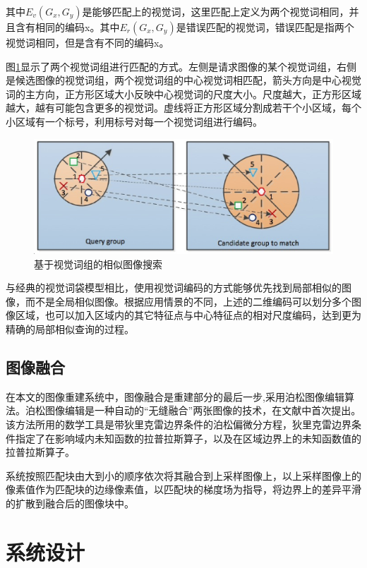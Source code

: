 \documentclass[UTF8]{csoarticle}
\begin{document}
其中\(E_v(G_x,G_y)\)是能够匹配上的视觉词，这里匹配上定义为两个视觉词相同，并且含有相同的编码x。其中\(E_r(G_x,G_y)\)是错误匹配的视觉词，错误匹配是指两个视觉词相同，但是含有不同的编码x。

图\ref{fig:visual}显示了两个视觉词组进行匹配的方式。左侧是请求图像的某个视觉词组，右侧是候选图像的视觉词组，两个视觉词组的中心视觉词相匹配，箭头方向是中心视觉词的主方向，正方形区域大小反映中心视觉词的尺度大小。尺度越大，正方形区域越大，越有可能包含更多的视觉词。虚线将正方形区域分割成若干个小区域，每个小区域有一个标号，利用标号对每一个视觉词组进行编码。

\begin{figure}
\centering\includegraphics[width=12cm]{visual_group}
\caption{基于视觉词组的相似图像搜索}
\label{fig:visual}
\end{figure}

与经典的视觉词袋模型相比，使用视觉词编码的方式能够优先找到局部相似的图像，而不是全局相似图像。根据应用情景的不同，上述的二维编码可以划分多个图像区域，也可以加入区域内的其它特征点与中心特征点的相对尺度编码，达到更为精确的局部相似查询的过程。

\subsection{图像融合}
在本文的图像重建系统中，图像融合是重建部分的最后一步,采用泊松图像编辑算法。泊松图像编辑是一种自动的“无缝融合”两张图像的技术，在文献\cite{Perez:2003ul}中首次提出。该方法所用的数学工具是带狄里克雷边界条件的泊松偏微分方程，狄里克雷边界条件指定了在影响域内未知函数的拉普拉斯算子，以及在区域边界上的未知函数值的拉普拉斯算子\cite{张建桥:2010vm}。

系统按照匹配块由大到小的顺序依次将其融合到上采样图像上，以上采样图像上的像素值作为匹配块的边缘像素值，以匹配块的梯度场为指导，将边界上的差异平滑的扩散到融合后的图像块中。

\section{系统设计}
\end{document}
